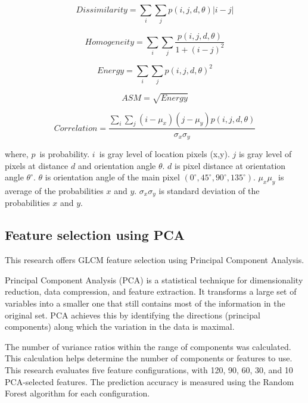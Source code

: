 \documentclass[10pt,a4paper]{article}
\begin{document}
\begin{equation} \label{eq:3}
Dissimilarity=\sum_{i}\sum_{j}p(i,j,d,\theta)|i-j|
\end{equation}


\begin{equation} \label{eq:4}
Homogeneity=\sum_{i}\sum_{j}\frac{p(i,j,d,\theta)}{1+(i-j)^2}
\end{equation}


\begin{equation} \label{eq:5}
Energy=\sum_{i}\sum_{j}p(i,j,d,\theta)^2
\end{equation}

\begin{equation} \label{eq:6}
ASM=\sqrt{Energy}
\end{equation}


\begin{equation} \label{eq:7}
    Correlation=\frac{\sum_{i}\sum_{j}(i-\mu_x)(j-\mu_y)p(i,j,d,\theta)}{\sigma_x\sigma_y}
\end{equation} 

where, $p$\ is probability. $i$\ is gray level of location pixels (x,y). $j$ is gray level of pixels at distance $d$ and orientation angle $\theta$. $d$ is pixel distance at orientation angle $\theta^\circ$. $\theta$ is orientation angle of the main pixel $(0^\circ, 45^\circ, 90^\circ, 135^\circ)$. $\mu_x\mu_y$ is average of the probabilities $x$ and $y$. $\sigma_x\sigma_y$ is standard deviation of the probabilities $x$ and $y$.


\subsection{Feature selection using PCA}

This research offers GLCM feature selection using Principal Component Analysis.

Principal Component Analysis (PCA) is a statistical technique for dimensionality reduction, data compression, and feature extraction. It transforms a large set of variables into a smaller one that still contains most of the information in the original set. PCA achieves this by identifying the directions (principal components) along which the variation in the data is maximal.

The number of variance ratios within the range of components was calculated. This calculation helps determine the number of components or features to use. This research evaluates five feature configurations, with 120, 90, 60, 30, and 10 PCA-selected features. The prediction accuracy is measured using the Random Forest algorithm for each configuration.
\end{document}
